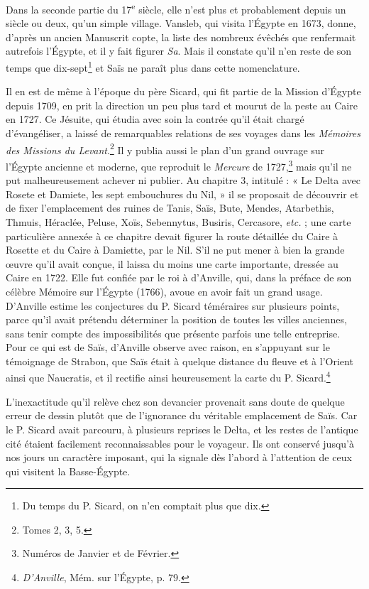 \documentclass[a4paper, 11pt, oneside]{article}
\begin{document}
Dans la seconde partie du 17\textsuperscript{e} siècle, elle n'est plus et probablement depuis un siècle ou deux, qu'un simple village. Vansleb, qui visita l'Égypte en 1673, donne, d'après un ancien Manuscrit copte, la liste des nombreux évêchés que renfermait autrefois l'Égypte, et il y fait figurer \emph{Sa}. Mais il constate qu'il n'en reste de son temps que dix-sept\footnote{Du temps du P. Sicard, on n'en comptait plus que dix.} et Saïs ne paraît plus dans cette nomenclature.

Il en est de même à l'époque du père Sicard, qui fit partie de la Mission d'Égypte depuis 1709, en prit la direction un peu plus tard et mourut de la peste au Caire en 1727. Ce Jésuite, qui étudia avec soin la contrée qu'il était chargé d'évangéliser, a laissé de remarquables relations de ses voyages dans les \emph{Mémoires des Missions du Levant}.\footnote{Tomes 2, 3, 5.} Il y publia aussi le plan d'un grand ouvrage sur l'Égypte ancienne et moderne, que reproduit le \emph{Mercure} de 1727,\footnote{Numéros de Janvier et de Février.} mais qu'il ne put malheureusement achever ni publier. Au chapitre 3, intitulé : « Le Delta avec Rosete et Damiete, les sept embouchures du Nil, » il se proposait de découvrir et de fixer l'emplacement des ruines de Tanis, Saïs, Bute, Mendes, Atarbethis, Thmuis, Héraclée, Peluse, Xoïs, Sebennytus, Busiris, Cercasore, \emph{etc.} ; une carte particulière annexée à ce chapitre devait figurer la route détaillée du Caire à Rosette et du Caire à Damiette, par le Nil. S'il ne put mener à bien la grande œuvre qu'il avait conçue, il laissa du moins une carte importante, dressée au Caire en 1722. Elle fut confiée par le roi à d'Anville, qui, dans la préface de son célèbre Mémoire sur l'Égypte (1766), avoue en avoir fait un grand usage. D'Anville estime les conjectures du P. Sicard téméraires sur plusieurs points, parce qu’il avait prétendu déterminer la position de toutes les villes anciennes, sans tenir compte des impossibilités que présente parfois une telle entreprise. Pour ce qui est de Saïs, d'Anville observe avec raison, en s'appuyant sur le témoignage de Strabon, que Saïs était à quelque distance du fleuve et à l'Orient ainsi que Naucratis, et il rectifie ainsi heureusement la carte du P. Sicard.\footnote{\emph{D'Anville}, Mém. sur l'Égypte, p. 79.}

L'inexactitude qu'il relève chez son devancier provenait sans doute de quelque erreur de dessin plutôt que de l'ignorance du véritable emplacement de Saïs. Car le P. Sicard avait parcouru, à plusieurs reprises le Delta, et les restes de l'antique cité étaient facilement reconnaissables pour le voyageur. Ils ont conservé jusqu'à nos jours un caractère imposant, qui la signale dès l'abord à l'attention de ceux qui visitent la Basse-Égypte.
\end{document}
